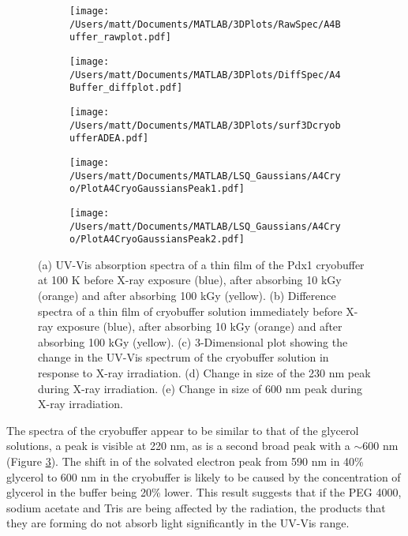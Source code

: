\begin{figure}[!htbp]
\centering
\begin{subfigure}{.33\textwidth}
  \centering
  \texttt{[image: /Users/matt/Documents/MATLAB/3DPlots/RawSpec/A4Buffer\_rawplot.pdf]}
  \caption{}
  \label{fig:A4Buffer_raw}
\end{subfigure}%
\begin{subfigure}{.33\textwidth}
  \centering
  \texttt{[image: /Users/matt/Documents/MATLAB/3DPlots/DiffSpec/A4Buffer\_diffplot.pdf]}
  \caption{}
  \label{fig:A4Buffer_diff}
\end{subfigure}
\begin{subfigure}{.33\textwidth}
  \centering
  \texttt{[image: /Users/matt/Documents/MATLAB/3DPlots/surf3DcryobufferADEA.pdf]}
  \caption{}
  \label{fig:A4Buffer_3Dplot}
\end{subfigure}
\begin{subfigure}{.33\textwidth}
  \centering
  \texttt{[image: /Users/matt/Documents/MATLAB/LSQ\_Gaussians/A4Cryo/PlotA4CryoGaussiansPeak1.pdf]}
  \caption{}
  \label{fig:A4Buffer_Peak1}
\end{subfigure}
\begin{subfigure}{.33\textwidth}
  \centering
  \texttt{[image: /Users/matt/Documents/MATLAB/LSQ\_Gaussians/A4Cryo/PlotA4CryoGaussiansPeak2.pdf]}
  \caption{}
  \label{fig:A4Buffer_Peak2}
\end{subfigure}
\caption[UV-Vis Spectra of X-ray irradiated cryobuffer solution]{(a) UV-Vis absorption spectra of a thin film of the Pdx1 cryobuffer at 100 K before X-ray exposure (blue), after absorbing 10 \si{\kilo\gray} (orange) and after absorbing 100 \si{\kilo\gray} (yellow). (b) Difference spectra of a thin film of cryobuffer solution immediately before X-ray exposure (blue), after absorbing 10 \si{\kilo\gray} (orange) and after absorbing 100 \si{\kilo\gray} (yellow). (c) 3-Dimensional plot showing the change in the UV-Vis spectrum of the cryobuffer solution in response to X-ray irradiation. (d) Change in size of the 230 nm peak during X-ray irradiation. (e) Change in size of 600 nm peak during X-ray irradiation.}
\end{figure}

The spectra of the cryobuffer appear to be similar to that of the glycerol solutions, a peak is visible at 220 nm, as is a second broad peak with a \lwl $\sim$600 nm (Figure \ref{fig:A4Buffer_3Dplot}). The shift in \lwl of the solvated electron peak from 590 nm in 40\% glycerol to 600 nm in the cryobuffer is likely to be caused by the concentration of glycerol in the buffer being 20\% lower. This result suggests that if the PEG 4000, sodium acetate and Tris are being affected by the radiation, the products that they are forming do not absorb light significantly in the UV-Vis range.
\FloatBarrier
\clearpage
